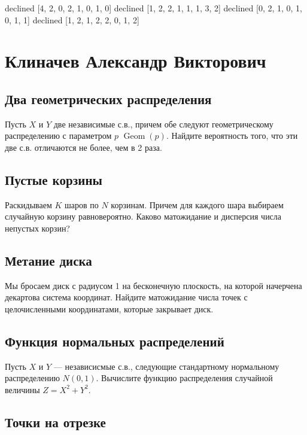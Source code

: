 \documentclass[12pt]{article}
\DeclareMathOperator{\Geom}{Geom}
\begin{document}
\newpage
declined  [4, 2, 0, 2, 1, 0, 1, 0]
declined  [1, 2, 2, 1, 1, 1, 3, 2]
declined  [0, 2, 1, 0, 1, 0, 1, 1]
declined  [1, 2, 1, 2, 2, 0, 1, 2]
\section{Клиначев Александр Викторович}

\subsection{Два геометрических распределения}

Пусть $X$ и $Y$ две независимые с.в., причем обе следуют геометрическому распределению с параметром $p$ $\Geom(p)$. Найдите вероятность того, что эти две с.в. отличаются не более, чем в 2 раза.



\subsection{Пустые корзины}

Раскидываем $K$ шаров по $N$ корзинам. Причем для каждого шара выбираем случайную корзину равновероятно. Каково матожидание и дисперсия числа непустых корзин?



\subsection{Метание диска}

Мы бросаем диск с радиусом 1 на бесконечную плоскость, на которой начерчена декартова система координат. Найдите матожидание числа точек с целочисленными координатами, которые закрывает диск.



\subsection{Функция нормальных распределений}

Пусть $X$ и $Y$ --- независисмые с.в., следующие стандартному нормальному распределению $N(0, 1)$. Вычислите функцию распределения случайной величины $Z = X^2 + Y^2$.



\subsection{Точки на отрезке}
\end{document}

